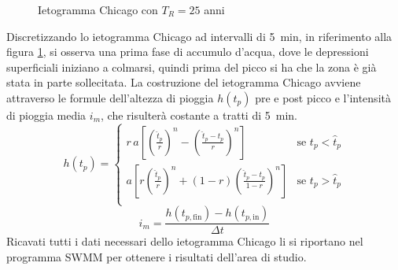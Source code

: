 \begin{figure}[htb]
    \centering
    \caption{Ietogramma Chicago con $T_R = 25$ anni}
    \label{fig:Chicago}
\end{figure}   

Discretizzando lo ietogramma Chicago ad intervalli di \SI{5}{\minute}, in riferimento alla figura \ref{fig:Chicago}, si osserva una prima fase di accumulo d'acqua, dove le depressioni superficiali iniziano a colmarsi, quindi prima del picco si ha che la zona è già stata in parte sollecitata.
La costruzione del ietogramma Chicago avviene attraverso le formule dell'altezza di pioggia $h(t_p)$ pre e post picco e l'intensità di pioggia media $i_m$, che risulterà costante a tratti di \SI{5}{\minute}.
\begin{equation}
\label{eq:altezza}
    h(t_p) = 
    \begin{cases}
        r \, a \left[ \left( \frac{\hat{t}_p}{r}\right)^n - \left( \frac{\hat{t}_p - t_p}{r}\right)^n  \right] & \text{se $t_p < \hat{t}_p$}\\
        a \left[ r \left( \frac{\hat{t}_p}{r}\right)^n + (1-r)\left( \frac{\hat{t}_p - t_p}{1 - r}\right)^n  \right] & \text{se $t_p > \hat{t}_p$}\\
    \end{cases}
\end{equation}
\begin{equation}
\label{eq:imedia}
    i_m = \frac{h(t_{p,\text{fin}}) - h(t_{p,\text{in}})}{\Delta t}
\end{equation}
Ricavati tutti i dati necessari dello ietogramma Chicago li si riportano nel programma SWMM per ottenere i risultati dell'area di studio.

